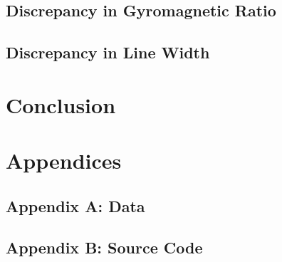 \documentclass[a4paper]{article}
\begin{document}
\subsection{Discrepancy in Gyromagnetic Ratio}
\qq 

\subsection{Discrepancy in Line Width}
\qq 

\section{Conclusion}
\qq 

\section{Appendices}

\subsection{Appendix A: Data}

\subsection{Appendix B: Source Code}
\end{document}
